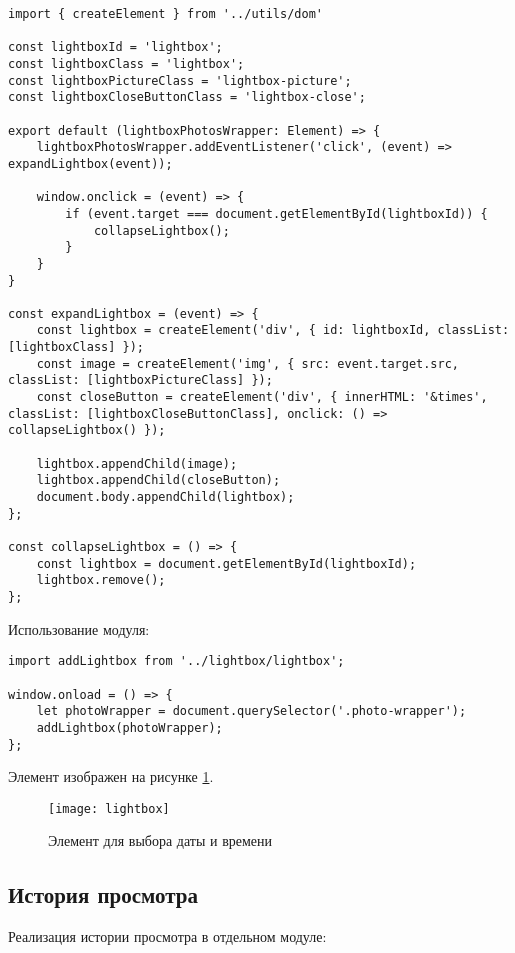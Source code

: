 \documentclass[a4paper,14pt]{extarticle}
\begin{document}
\begin{lstlisting}
import { createElement } from '../utils/dom'

const lightboxId = 'lightbox';
const lightboxClass = 'lightbox';
const lightboxPictureClass = 'lightbox-picture';
const lightboxCloseButtonClass = 'lightbox-close';

export default (lightboxPhotosWrapper: Element) => {
    lightboxPhotosWrapper.addEventListener('click', (event) => expandLightbox(event));

    window.onclick = (event) => {
        if (event.target === document.getElementById(lightboxId)) {
            collapseLightbox();
        }
    }
}

const expandLightbox = (event) => {
    const lightbox = createElement('div', { id: lightboxId, classList: [lightboxClass] });
    const image = createElement('img', { src: event.target.src, classList: [lightboxPictureClass] });
    const closeButton = createElement('div', { innerHTML: '&times', classList: [lightboxCloseButtonClass], onclick: () => collapseLightbox() });

    lightbox.appendChild(image);
    lightbox.appendChild(closeButton);
    document.body.appendChild(lightbox);
};

const collapseLightbox = () => {
    const lightbox = document.getElementById(lightboxId);
    lightbox.remove();
};
\end{lstlisting}

Использование модуля:

\begin{lstlisting}
import addLightbox from '../lightbox/lightbox';

window.onload = () => {
    let photoWrapper = document.querySelector('.photo-wrapper');
    addLightbox(photoWrapper);
};
\end{lstlisting}

Элемент изображен на рисунке \ref{fig:lightbox}.

\begin{figure}[H]
    \centering
    \texttt{[image: lightbox]}
    \caption{Элемент для выбора даты и времени}
    \label{fig:lightbox}
\end{figure}

\subsection{История просмотра}
Реализация истории просмотра в отдельном модуле:
\end{document}
